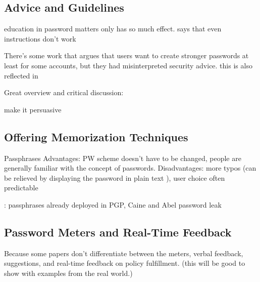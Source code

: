 	

	\subsection{Advice and Guidelines}
	
	education in password matters only has so much effect. 
	\cite{Forget2007HelpingUsers} says that even instructions don't work
	
	There's some work that argues that users want to create stronger passwords at least for some accounts, but they had
	misinterpreted security advice. 
	this is also reflected in \cite{Ur2016PerceptionsPassword}
	
	Great overview and critical discussion: \cite{ZhangKennedy2016RevisitingPasswordRules}
	
	
	make it persuasive \cite{Zakaria2013DesigningEffectiveSecurityMessages}
		
	
	\subsection{Offering Memorization Techniques}
	
	
	\cite{Bonneau2014ReliableStorage56Bits}
	\cite{Forget2007HelpingUsers}
	
	Passphrases
	Advantages: PW scheme doesn't have to be changed, people are generally familiar with the concept of passwords.
	Disadvantages: more typos (can be relieved by displaying the password in plain text  \cite{Melicher2016UsabilityMobileTextPasswords}), user choice often predictable
	
	\cite{Bonneau2012LinguisticProperties}: passphrases already deployed in PGP, Caine and Abel password leak \cite{Carnavalet2014AnalyzingPWStrengthMeters} 
	

	
	\cite{Shay2012CorrectHorseBatteryStaple}
	
	
	
	\subsection{Password Meters and Real-Time Feedback}
	
	 Because some papers don't differentiate between the meters, verbal feedback, suggestions, and real-time feedback on policy fulfillment. (this will be good to show with examples from the real world.)
	
	

